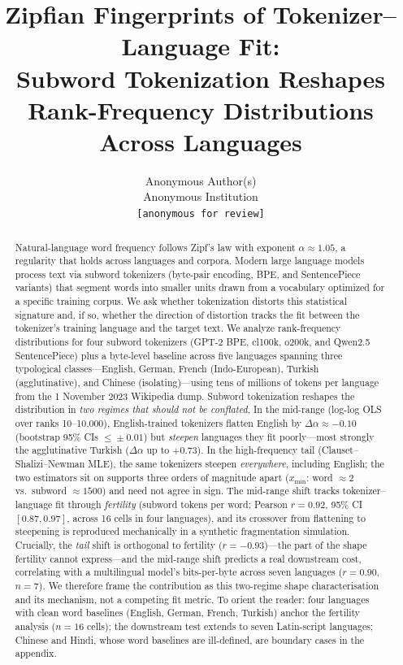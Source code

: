 \documentclass{article}
\title{Zipfian Fingerprints of Tokenizer--Language Fit:\\
Subword Tokenization Reshapes Rank-Frequency Distributions Across Languages}
\author{Anonymous Author(s) \\ Anonymous Institution \\ \texttt{[anonymous for review]}}
\begin{document}
\maketitle

\begin{abstract}
  Natural-language word frequency follows Zipf's law with exponent $\alpha \approx 1.05$,
  a regularity that holds across languages and corpora. Modern large language models
  process text via subword tokenizers (byte-pair encoding, BPE, and SentencePiece
  variants) that segment words into smaller units drawn from a vocabulary optimized for
  a specific training corpus. We ask whether tokenization distorts this statistical
  signature and, if so, whether the direction of distortion tracks the fit between the
  tokenizer's training language and the target text. We analyze rank-frequency
  distributions for four subword tokenizers (GPT-2 BPE, cl100k, o200k, and Qwen2.5
  SentencePiece) plus a byte-level baseline across five languages spanning three
  typological classes---English, German, French (Indo-European), Turkish (agglutinative),
  and Chinese (isolating)---using tens of millions of tokens per language from the
  1 November 2023 Wikipedia dump. Subword tokenization reshapes the distribution in
  \emph{two regimes that should not be conflated}. In the mid-range (log-log OLS over
  ranks 10--10{,}000), English-trained tokenizers flatten English by
  $\Delta\alpha \approx -0.10$ (bootstrap 95\% CIs $\leq\!\pm 0.01$) but \emph{steepen}
  languages they fit poorly---most strongly the agglutinative Turkish ($\Delta\alpha$ up
  to $+0.73$). In the high-frequency tail (Clauset--Shalizi--Newman MLE), the same
  tokenizers steepen \emph{everywhere}, including English; the two estimators sit on
  supports three orders of magnitude apart ($x_{\min}$: word $\approx 2$ vs.\ subword
  $\approx 1500$) and need not agree in sign. The mid-range shift tracks
  tokenizer--language fit through \emph{fertility} (subword tokens per word; Pearson
  $r = 0.92$, 95\% CI $[0.87, 0.97]$, across 16 cells in four languages), and its
  crossover from flattening to steepening is reproduced mechanically in a synthetic
  fragmentation simulation. Crucially, the \emph{tail} shift is orthogonal to fertility
  ($r = -0.93$)---the part of the shape fertility cannot express---and the mid-range shift
  predicts a real downstream cost, correlating with a multilingual model's bits-per-byte
  across seven languages ($r = 0.90$, $n{=}7$). We therefore frame the contribution as
  this two-regime shape characterisation and its mechanism, not a competing fit metric.
  To orient the reader: four languages with clean word baselines (English, German, French,
  Turkish) anchor the fertility analysis ($n{=}16$ cells); the downstream test extends to
  seven Latin-script languages; Chinese and Hindi, whose word baselines are ill-defined,
  are boundary cases in the appendix.
\end{abstract}
\end{document}

